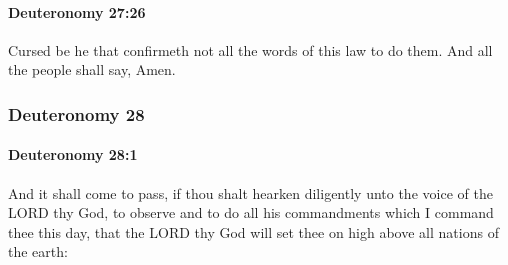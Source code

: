 		\paragraph{Deuteronomy 27:26} %
			\label{DEUTERONOMY-27-26}

			Cursed be he that confirmeth not all the words of this law to do them. And all the people shall say, Amen.

	\subsubsection{Deuteronomy 28} %
		\label{DEUTERONOMY-28}

		\paragraph{Deuteronomy 28:1} %
			\label{DEUTERONOMY-28-1}

			And it shall come to pass, if thou shalt hearken diligently unto the voice of the LORD thy God, to observe and to do all his commandments which I command thee this day, that the LORD thy God will set thee on high above all nations of the earth:

